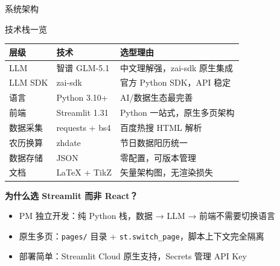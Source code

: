 \documentclass[aspectratio=169, UTF8]{ctexbeamer}
\begin{document}
\begin{frame}{系统架构}
\begin{center}
  \end{center}
\end{frame}

\begin{frame}{技术栈一览}
  \begin{center}
    \begin{tabular}{l l l}
      \toprule
      \textbf{层级} & \textbf{技术} & \textbf{选型理由} \\
      \midrule
      LLM       & 智谱 GLM-5.1     & 中文理解强，zai-sdk 原生集成 \\
      LLM SDK   & zai-sdk          & 官方 Python SDK，API 稳定 \\
      语言      & Python 3.10+     & AI/数据生态最完善 \\
      前端      & Streamlit 1.31   & Python 一站式，原生多页架构 \\
      数据采集  & requests + bs4   & 百度热搜 HTML 解析 \\
      农历换算  & zhdate           & 节日数据阳历统一 \\
      数据存储  & JSON             & 零配置，可版本管理 \\
      文档      & LaTeX + TikZ     & 矢量架构图，无渲染损失 \\
      \bottomrule
    \end{tabular}
  \end{center}

  \vspace{0.5em}
  \textbf{为什么选 Streamlit 而非 React？}
  \begin{itemize}
    \item PM 独立开发：纯 Python 栈，数据 → LLM → 前端不需要切换语言
    \item 原生多页：\texttt{pages/} 目录 + \texttt{st.switch\_page}，脚本上下文完全隔离
    \item 部署简单：Streamlit Cloud 原生支持，Secrets 管理 API Key
  \end{itemize}
\end{frame}
\end{document}
